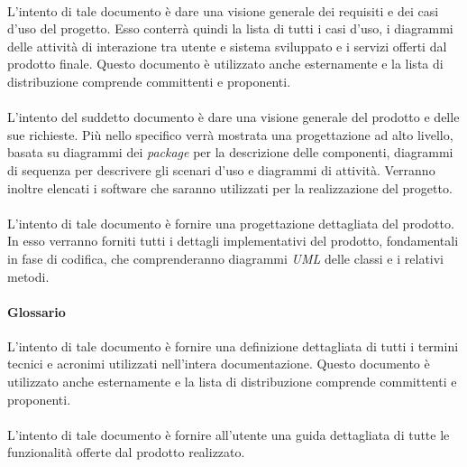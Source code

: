 \paragraph{\AdR}
L'intento di tale documento è dare una visione generale dei requisiti e dei casi
d'uso del progetto. Esso conterrà quindi la lista di tutti i casi d'uso,
i diagrammi delle attività di interazione tra utente e sistema sviluppato e
i servizi offerti dal prodotto finale. Questo documento è
utilizzato anche esternamente e la lista di distribuzione comprende committenti
e proponenti.
\paragraph{\ST}
L'intento del suddetto documento è dare una visione generale del prodotto e
delle sue richieste. Più nello specifico verrà mostrata una progettazione ad
alto livello, basata su diagrammi dei \textit{package} per la descrizione delle
componenti, diagrammi di sequenza per descrivere gli scenari d'uso e diagrammi
di attività. Verranno inoltre elencati i software che saranno utilizzati per la realizzazione del progetto.
\paragraph{\DDP}
L'intento di tale documento è fornire una progettazione dettagliata del
prodotto. In esso verranno forniti tutti i dettagli implementativi
del prodotto, fondamentali in fase di codifica, che comprenderanno diagrammi \textit{UML}
delle classi e i relativi metodi.
\paragraph{Glossario}
L'intento di tale documento è fornire una definizione dettagliata di tutti i
termini tecnici e acronimi utilizzati nell'intera documentazione. Questo documento è
utilizzato anche esternamente e la lista di distribuzione comprende committenti
e proponenti.
\paragraph{\MU}
L'intento di tale documento è fornire all'utente una guida dettagliata di tutte
le funzionalità offerte dal prodotto realizzato.
